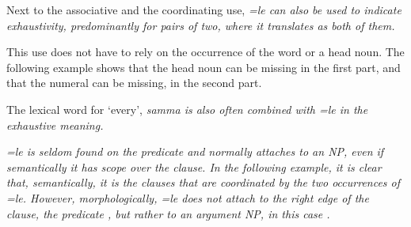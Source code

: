 Next to the associative and the coordinating use, \em =le \em can also be used to indicate exhaustivity, predominantly for pairs of two, where it translates as \em both of them\em.



This use does not have to rely on the occurrence of the word  or a head noun. The following example shows that the head noun can be missing in the first part, and that the numeral can be missing, in the second part.


The lexical word for `every', \em samma \em is also often combined with \em =le \em in the exhaustive meaning.



\em =le \em is seldom found on the predicate and normally attaches to an NP, even if semantically it has scope over the clause. In the following example, it is clear that, semantically, it is the clauses that are coordinated by the two occurrences of \em =le\em. However,  morphologically, \em =le \em does not attach to the right edge of the clause,  the predicate , but rather to an argument NP, in this case .


